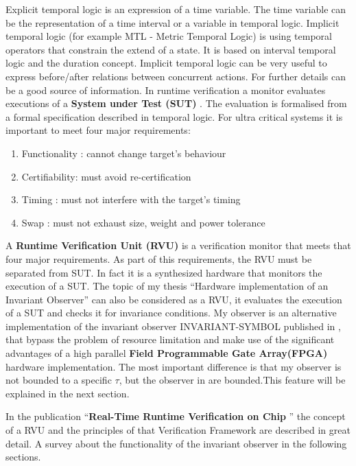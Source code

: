 Explicit temporal logic is an expression of a time variable. The time variable can be the representation of a time interval or a variable in temporal logic. 
Implicit temporal logic (for example MTL - Metric Temporal Logic) is using temporal operators that constrain the extend of a state.
It is based on interval temporal logic and the duration concept.
Implicit temporal logic can be very useful to express before/after relations between concurrent actions.
For further details \cite{210306} can be a good source of information.
In runtime verification a monitor evaluates executions of a \textbf{System under Test (SUT)} \cite{RTFMBJ13}. 
The evaluation is formalised from a formal specification described in temporal logic.\newpage
For ultra critical systems it is important to meet four major requirements:
\begin{enumerate}
 \item Functionality : cannot change target's behaviour
 \item Certifiability: must avoid re-certification
 \item Timing :	  must not interfere with the target's timing
 \item Swap :     must not exhaust size, weight and power tolerance
\end{enumerate}

A \textbf{Runtime Verification Unit (RVU)} is a verification monitor that meets that four major requirements.
As part of this requirements, the RVU must be separated from SUT.
In fact it is a synthesized hardware that monitors the execution of a SUT.\newline
The topic of my thesis ``Hardware implementation of an Invariant Observer'' can also be considered as a RVU, 
it evaluates the execution of a SUT and checks it for invariance conditions.
My observer is an alternative  implementation of the invariant observer INVARIANT-SYMBOL published in \cite{RTFMBJ13},
that bypass the problem of resource limitation and make use of the significant advantages of a high parallel
\textbf{Field Programmable Gate Array(FPGA)} hardware implementation.
The most important difference is that my observer is not bounded to a specific $\tau$, but the observer in \cite{RTFMBJ13}
are bounded.This feature will be explained in the next section.

In the publication ``\textbf{Real-Time Runtime Verification on Chip} '' \cite{RTFMBJ13} the concept of a RVU and 
the principles of that Verification Framework are described in great detail.\newline\newline
A survey about the functionality of the invariant observer in the following sections.




